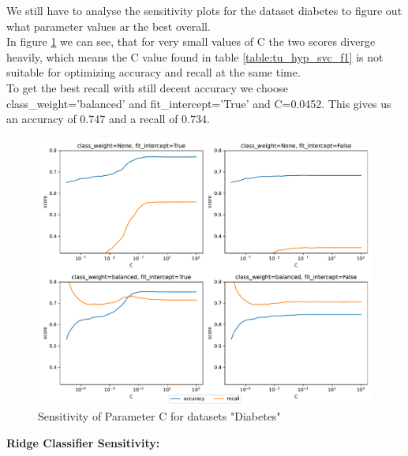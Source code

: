 \documentclass[a4paper,10pt]{article}
\begin{document}
We still have to analyse the sensitivity plots for the dataset diabetes to figure out what parameter values ar the best overall.\\
In figure \ref{fig:sensitivity svc diabetes} we can see, that for very small values of \textsf{C} the two scores diverge heavily, which means the \textsf{C} value found in table \ref{table:tu_hyp_svc_f1} is not suitable for optimizing accuracy and recall at the same time.\\
To get the best recall with still decent accuracy we choose \textsf{class\_weight}=\textsf{'balanced'} and \textsf{fit\_intercept}='True' and \textsf{C}=0.0452. This gives us an accuracy of 0.747 and a recall of 0.734.%

\begin{figure}[h!]
    \centering
    \includegraphics[width=\textwidth]{diabetes/plots/linearsvc_parameter_sensitivity.pdf}
    \caption{Sensitivity of Parameter \textsf{C} for datasets "Diabetes"}
    \label{fig:sensitivity svc diabetes}
\end{figure}

\textbf{Ridge Classifier Sensitivity:}
\end{document}
